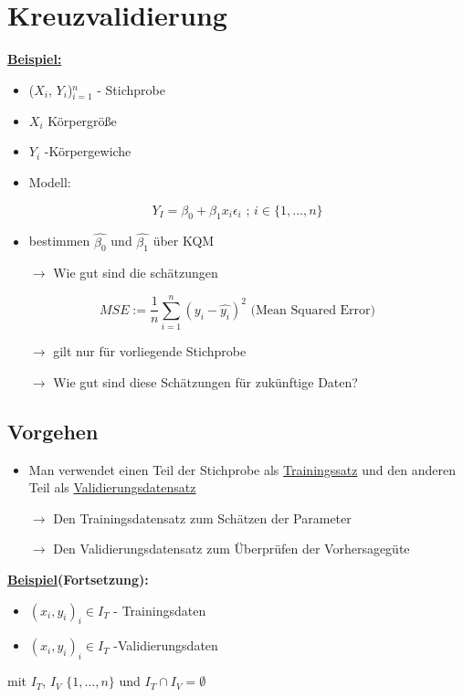 \documentclass[10pt]{report}
\theoremstyle{definition}
\begin{document}
\section{Kreuzvalidierung}
\textbf{\underline{Beispiel:}}
	\begin{itemize}
		\item ($X_i$, $Y_i$)$_{i=1}^n$ - Stichprobe
		\item $X_i$ Körpergröße
		\item $Y_i$ -Körpergewiche
		\item Modell: 
	\end{itemize}
		\[Y_I = \beta_0 + \beta_1 x_i\epsilon_i \text{ ; } i \in \{1, \ldots,n\}\]
\begin{itemize}
\item bestimmen $\hat{\beta_0}$ und $\hat{\beta_1}$ über KQM
\item [\(\rightarrow\)] Wie gut sind die schätzungen
\end{itemize}


\[ MSE := \frac{1}{n} \sum_{i = 1}^{n} (y_i - \hat{y_i})^2 \text{  (Mean Squared Error)}\]

\begin{itemize}
	\item[\( \rightarrow \)] gilt nur für vorliegende Stichprobe
	\item[\( \rightarrow \)] Wie gut sind diese Schätzungen für zukünftige Daten?
\end{itemize}

\subsection{Vorgehen}
\begin{itemize}
	\item Man verwendet einen Teil der Stichprobe als \underline{Trainingssatz} und den anderen Teil als \underline{Validierungsdatensatz}
	\item[\( \rightarrow \)] Den Trainingsdatensatz zum Schätzen der Parameter
	\item[\( \rightarrow \)] Den Validierungsdatensatz zum Überprüfen der Vorhersagegüte
\end{itemize}

\textbf{\underline{Beispiel}(Fortsetzung):}
\begin{itemize}
	\item $(x_i, y_i)_i \in I_T$ - Trainingsdaten
	\item $(x_i,y_i)_i \in I_T$ -Validierungsdaten
\end{itemize}
mit $ I_T $, $ I_V $   $\{1,\ldots,n\}$   und $I_T \cap I_V = \emptyset$
	
\end{document}

